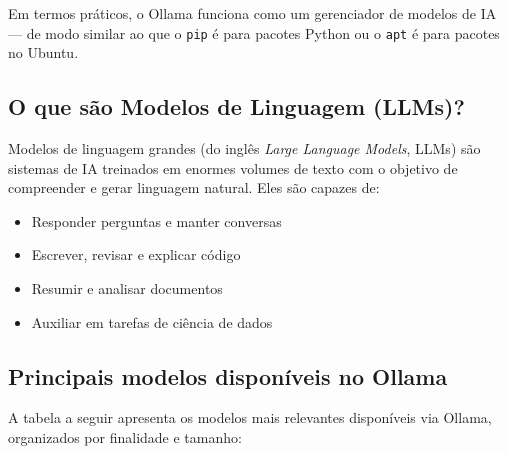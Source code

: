 \documentclass[
]{article}
\providecommand{\tightlist}{%
  \setlength{\itemsep}{0pt}\setlength{\parskip}{0pt}}
\begin{document}
Em termos práticos, o Ollama funciona como um gerenciador de modelos de
IA --- de modo similar ao que o \texttt{pip} é para pacotes Python ou o
\texttt{apt} é para pacotes no Ubuntu.

\subsection{O que são Modelos de Linguagem
(LLMs)?}\label{o-que-suxe3o-modelos-de-linguagem-llms}

Modelos de linguagem grandes (do inglês \emph{Large Language Models},
LLMs) são sistemas de IA treinados em enormes volumes de texto com o
objetivo de compreender e gerar linguagem natural. Eles são capazes de:

\begin{itemize}
\tightlist
\item
  Responder perguntas e manter conversas
\item
  Escrever, revisar e explicar código
\item
  Resumir e analisar documentos
\item
  Auxiliar em tarefas de ciência de dados
\end{itemize}

\subsection{Principais modelos disponíveis no
Ollama}\label{principais-modelos-disponuxedveis-no-ollama}

A tabela a seguir apresenta os modelos mais relevantes disponíveis via
Ollama, organizados por finalidade e tamanho:
\end{document}
